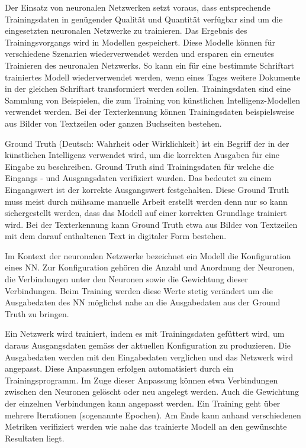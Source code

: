 \documentclass[a4paper,oneside, 12pt]{report}
\begin{document}
Der Einsatz von neuronalen Netzwerken setzt voraus, dass entsprechende Trainingsdaten in genügender Qualität und Quantität verfügbar sind um die eingesetzten neuronalen Netzwerke zu trainieren. Das Ergebnis des Trainingsvorgangs wird in Modellen gespeichert. Diese Modelle können für verschiedene Szenarien wiederverwendet werden und ersparen ein erneutes Trainieren des neuronalen Netzwerks. So kann ein für eine bestimmte Schriftart trainiertes Modell wiederverwendet werden, wenn eines Tages weitere Dokumente in der gleichen Schriftart transformiert werden sollen.
Trainingsdaten sind eine Sammlung von Beispielen, die zum Training von künstlichen Intelligenz-Modellen verwendet werden. Bei der Texterkennung können Trainingsdaten beispielsweise aus Bilder von Textzeilen oder ganzen Buchseiten bestehen.

Ground Truth (Deutsch: Wahrheit oder Wirklichkeit) ist ein Begriff der in der künstlichen Intelligenz verwendet wird, um die korrekten Ausgaben für eine Eingabe zu beschreiben. Ground Truth sind Trainingsdaten für welche die Eingangs - und Ausgangsdaten verifiziert wurden. Das bedeutet zu einem Eingangswert ist der korrekte Ausgangswert festgehalten. Diese Ground Truth muss meist durch mühsame manuelle Arbeit erstellt werden denn nur so kann sichergestellt werden, dass das Modell auf einer korrekten Grundlage trainiert wird. Bei der Texterkennung kann Ground Truth etwa aus Bilder von Textzeilen mit dem darauf enthaltenen Text in digitaler Form bestehen.

Im Kontext der neuronalen Netzwerke bezeichnet ein Modell die Konfiguration eines \ac{NN}. Zur Konfiguration gehören die Anzahl und Anordnung der Neuronen, die Verbindungen unter den Neuronen sowie die Gewichtung dieser Verbindungen. Beim Training werden diese Werte stetig verändert um die Ausgabedaten des \ac{NN} möglichst nahe an die Ausgabedaten aus der Ground Truth zu bringen.

Ein Netzwerk wird trainiert, indem es mit Trainingsdaten gefüttert wird, um daraus Ausgangsdaten gemäss der aktuellen Konfiguration zu produzieren. Die Ausgabedaten werden mit den Eingabedaten verglichen und das Netzwerk wird angepasst. Diese Anpassungen erfolgen automatisiert durch ein Trainingsprogramm. Im Zuge dieser Anpassung können etwa Verbindungen zwischen den Neuronen gelöscht oder neu angelegt werden. Auch die Gewichtung der einzelnen Verbindungen kann angepasst werden. Ein Training geht über mehrere Iterationen (sogenannte Epochen). Am Ende kann anhand verschiedenen Metriken verifiziert werden wie nahe das trainierte Modell an den gewünschte Resultaten liegt.\cite{ibmnn}
\end{document}

